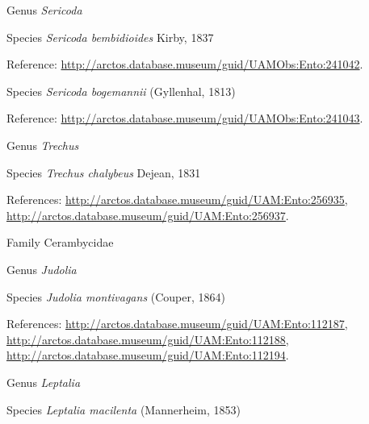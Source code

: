 \documentclass[9pt, article]{memoir}
\begin{document}
\begin{multicols}{2}
\vspace{6pt}\noindent\hspace{30pt}Genus \textit{Sericoda}


\vspace{6pt}\noindent\hspace{36pt}Species \textit{Sericoda bembidioides} Kirby, 1837


\vspace{6pt}Reference: 
\url{http://arctos.database.museum/guid/UAMObs:Ento:241042}.

\vspace{6pt}\noindent\hspace{36pt}Species \textit{Sericoda bogemannii} (Gyllenhal, 1813)


\vspace{6pt}Reference: 
\url{http://arctos.database.museum/guid/UAMObs:Ento:241043}.

\vspace{6pt}\noindent\hspace{30pt}Genus \textit{Trechus}


\vspace{6pt}\noindent\hspace{36pt}Species \textit{Trechus chalybeus} Dejean, 1831


\vspace{6pt}References: 
\url{http://arctos.database.museum/guid/UAM:Ento:256935}, 
\url{http://arctos.database.museum/guid/UAM:Ento:256937}.

\vspace{6pt}\noindent\hspace{24pt}Family Cerambycidae


\vspace{6pt}\noindent\hspace{30pt}Genus \textit{Judolia}


\vspace{6pt}\noindent\hspace{36pt}Species \textit{Judolia montivagans} (Couper, 1864)


\vspace{6pt}References: 
\url{http://arctos.database.museum/guid/UAM:Ento:112187}, 
\url{http://arctos.database.museum/guid/UAM:Ento:112188}, 
\url{http://arctos.database.museum/guid/UAM:Ento:112194}.

\vspace{6pt}\noindent\hspace{30pt}Genus \textit{Leptalia}


\vspace{6pt}\noindent\hspace{36pt}Species \textit{Leptalia macilenta} (Mannerheim, 1853)



\end{multicols}
\end{document}
